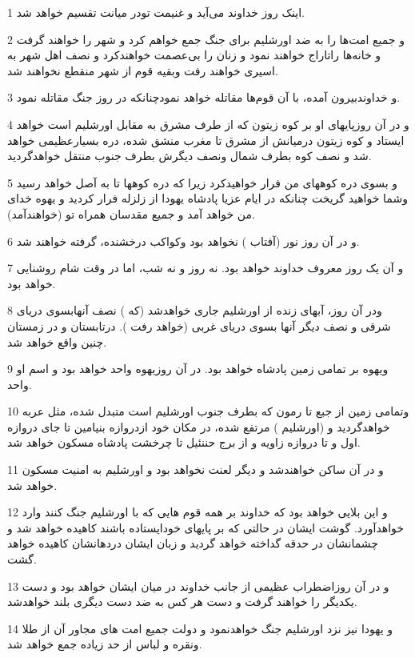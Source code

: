 \par 1 اینک روز خداوند می‌آید و غنیمت تودر میانت تقسیم خواهد شد.
\par 2 و جمیع امت‌ها را به ضد اورشلیم برای جنگ جمع خواهم کرد و شهر را خواهند گرفت و خانه‌ها راتاراج خواهند نمود و زنان را بی‌عصمت خواهندکرد و نصف اهل شهر به اسیری خواهند رفت وبقیه قوم از شهر منقطع نخواهند شد.
\par 3 و خداوندبیرون آمده، با آن قوم‌ها مقاتله خواهد نمودچنانکه در روز جنگ مقاتله نمود.
\par 4 و در آن روزپایهای او بر کوه زیتون که از طرف مشرق به مقابل اورشلیم است خواهد ایستاد و کوه زیتون درمیانش از مشرق تا مغرب منشق شده، دره بسیارعظیمی خواهد شد و نصف کوه بطرف شمال ونصف دیگرش بطرف جنوب منتقل خواهدگردید.
\par 5 و بسوی دره کوههای من فرار خواهیدکرد زیرا که دره کوهها تا به آصل خواهد رسید وشما خواهید گریخت چنانکه در ایام عزیا پادشاه یهودا از زلزله فرار کردید و یهوه خدای من خواهد آمد و جمیع مقدسان همراه تو (خواهندآمد).
\par 6 و در آن روز نور (آفتاب ) نخواهد بود وکواکب درخشنده، گرفته خواهند شد.
\par 7 و آن یک روز معروف خداوند خواهد بود. نه روز و نه شب، اما در وقت شام روشنایی خواهد بود.
\par 8 ودر آن روز، آبهای زنده از اورشلیم جاری خواهدشد (که ) نصف آنهابسوی دریای شرقی و نصف دیگر آنها بسوی دریای غربی (خواهد رفت ). درتابستان و در زمستان چنین واقع خواهد شد.
\par 9 ویهوه بر تمامی زمین پادشاه خواهد بود. در آن روزیهوه واحد خواهد بود و اسم او واحد.
\par 10 وتمامی زمین از جبع تا رمون که بطرف جنوب اورشلیم است متبدل شده، مثل عربه خواهدگردید و (اورشلیم ) مرتفع شده، در مکان خود ازدروازه بنیامین تا جای دروازه اول و تا دروازه زاویه و از برج حننئیل تا چرخشت پادشاه مسکون خواهد شد.
\par 11 و در آن ساکن خواهندشد و دیگر لعنت نخواهد بود و اورشلیم به امنیت مسکون خواهد شد.
\par 12 و این بلایی خواهد بود که خداوند بر همه قوم هایی که با اورشلیم جنگ کنند وارد خواهدآورد. گوشت ایشان در حالتی که بر پایهای خودایستاده باشند کاهیده خواهد شد و چشمانشان در حدقه گداخته خواهد گردید و زبان ایشان دردهانشان کاهیده خواهد گشت.
\par 13 و در آن روزاضطراب عظیمی از جانب خداوند در میان ایشان خواهد بود و دست یکدیگر را خواهند گرفت و دست هر کس به ضد دست دیگری بلند خواهدشد.
\par 14 و یهودا نیز نزد اورشلیم جنگ خواهدنمود و دولت جمیع امت های مجاور آن از طلا ونقره و لباس از حد زیاده جمع خواهد شد.
